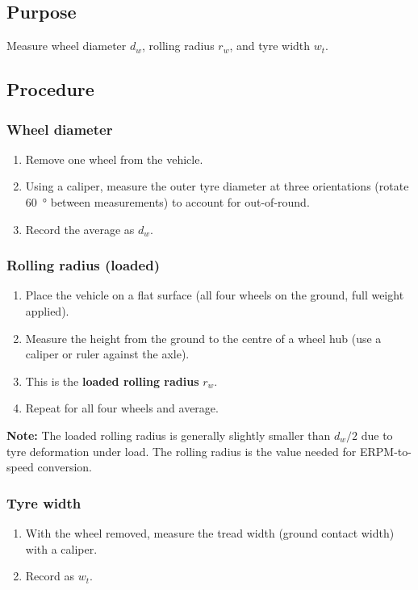 \documentclass[a4paper,11pt]{article}
\newcommand{\note}[1]{\textbf{Note:} #1}
\begin{document}
\subsection{Purpose}
Measure wheel diameter $d_w$, rolling radius $r_w$, and tyre width $w_t$.

\subsection{Procedure}

\subsubsection{Wheel diameter}
\begin{enumerate}
  \item Remove one wheel from the vehicle.
  \item Using a caliper, measure the outer tyre diameter at three
        orientations (rotate \SI{60}{\degree} between measurements)
        to account for out-of-round.
  \item Record the average as $d_w$.
\end{enumerate}

\subsubsection{Rolling radius (loaded)}
\begin{enumerate}
  \item Place the vehicle on a flat surface (all four wheels on the ground,
        full weight applied).
  \item Measure the height from the ground to the centre of a wheel hub
        (use a caliper or ruler against the axle).
  \item This is the \textbf{loaded rolling radius} $r_w$.
  \item Repeat for all four wheels and average.
\end{enumerate}

\note{The loaded rolling radius is generally slightly smaller than
$d_w/2$ due to tyre deformation under load.  The rolling radius is the
value needed for ERPM-to-speed conversion.}

\subsubsection{Tyre width}
\begin{enumerate}
  \item With the wheel removed, measure the tread width (ground contact
        width) with a caliper.
  \item Record as $w_t$.
\end{enumerate}
\end{document}
